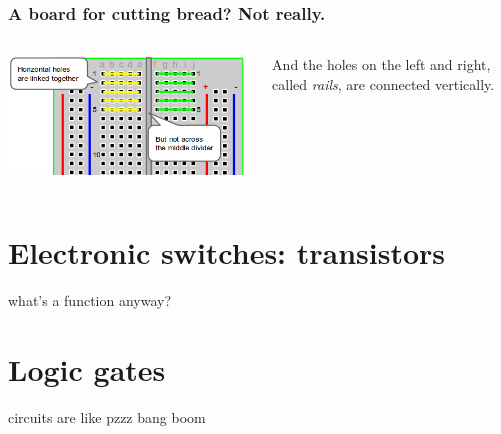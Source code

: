\documentclass{beamer}
\begin{document}
\begin{frame}
  \frametitle{A board for cutting bread? Not really.}

  \begin{columns}
    \begin{column}{0.5\textwidth}
      \includegraphics[width=\textwidth]{res/bb-diag.png}
    \end{column}
    \begin{column}{0.5\textwidth}
      And the holes on the left and right, called \emph{rails}, are connected vertically.
    \end{column}
  \end{columns}
\end{frame}

\section{Electronic switches: transistors}

\begin{frame}
  what's a function anyway?
\end{frame}

\section{Logic gates}

\begin{frame}
  circuits are like pzzz bang boom
\end{frame}
\end{document}
